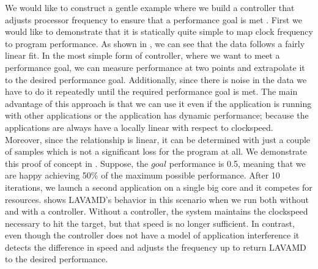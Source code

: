 We would like to construct a gentle example where we build a controller that adjusts processor frequency to ensure that a performance goal is met
\cite{lefurgy}. First we would like to demonstrate that it is statically quite simple to map clock frequency to program performance. As shown in , we can see that the data follows a fairly linear fit. In the most simple form of controller, where we want to meet a performance goal, we can measure performance at two points and extrapolate it to the desired performance goal. Additionally, since there is noise in the data we have to do it repeatedly until the required performance goal is met. The main advantage of this approach is that we can use it even if the application is running with other applications or the application has dynamic performance; because the applications are always have a locally linear with respect to clockspeed. Moreover, since the relationship is linear, it can be determined with just a couple of samples which is not a significant loss for the program at all. We demonstrate this proof of concept in . Suppose, the $goal$
performance is 0.5, meaning that we are happy achieving 50\% of the
maximum possible performance. After 10 iterations, we launch a second
application on a single big core and it competes for resources.
 shows LAVAMD's behavior in this scenario
when we run both without and with a controller.  Without a controller,
the system maintains the clockspeed necessary to hit the target, but
that speed is no longer sufficient.  In contrast, even though the
controller does not have a model of application interference it
detects the difference in speed and adjusts the frequency up to return
LAVAMD to the desired performance. 

